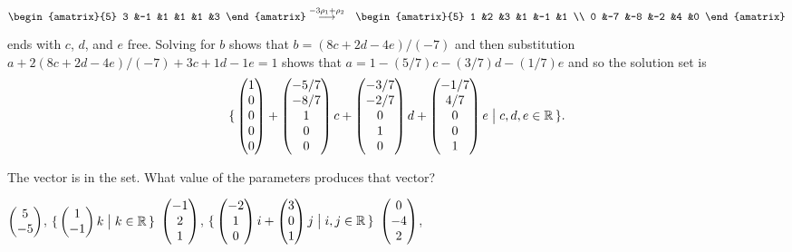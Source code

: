 \begin{exercises}
\begin{answer}
\begin{exparts}
\begin{eqnarray*}
\begin{amatrix}{5}
            3  &-1 &1   &1  &1  &3
          \end{amatrix}
          &\grstep{-3\rho_1+\rho_2}
          &\begin{amatrix}{5}
            1  &2  &3   &1  &-1 &1  \\
            0  &-7 &-8  &-2 &4  &0
          \end{amatrix}
        \end{eqnarray*}
        ends with \( c \), \( d \), and \( e \) free.
        Solving for \( b \) shows that \( b=(8c+2d-4e)/(-7) \) and then 
        substitution
        \( a+2(8c+2d-4e)/(-7)+3c+1d-1e=1 \) shows that 
        \( a=1-(5/7)c-(3/7)d-(1/7)e \) and so the solution set is
        \begin{equation*}
          \mbox{$\{\,\begin{pmatrix} 1 \\ 0 \\ 0 \\ 0 \\ 0 \end{pmatrix}
               +\begin{pmatrix} -5/7 \\ -8/7 \\ 1 \\ 0 \\ 0 \end{pmatrix}c
               +\begin{pmatrix} -3/7 \\ -2/7 \\ 0 \\ 1 \\ 0 \end{pmatrix}d
               +\begin{pmatrix} -1/7 \\ 4/7 \\ 0 \\ 0 \\ 1 \end{pmatrix}e
              \bigm| c,d,e\in\mathbb{R}\,\}$}.
        \end{equation*}
    \end{exparts}  
   \end{answer}
  \recommended \item 
    The vector is in the set.
    What value of the parameters produces that vector?
    \begin{exparts}
      \partsitem $\begin{pmatrix} 5 \\ -5 \end{pmatrix}$,
        $\mbox{$\{\,\begin{pmatrix} 1 \\ -1 \end{pmatrix}k\bigm| k\in\mathbb{R}\,\}$}$
      \partsitem $\begin{pmatrix} -1 \\ 2 \\ 1 \end{pmatrix}$,
        $\mbox{$\{\,\begin{pmatrix} -2 \\ 1 \\ 0 \end{pmatrix}i
           +\begin{pmatrix} 3 \\ 0 \\ 1 \end{pmatrix}j\bigm| i,j\in\mathbb{R}\,\}$}$
      \partsitem $\begin{pmatrix} 0 \\ -4 \\ 2 \end{pmatrix}$,

\end{exparts}
\end{exercises}

